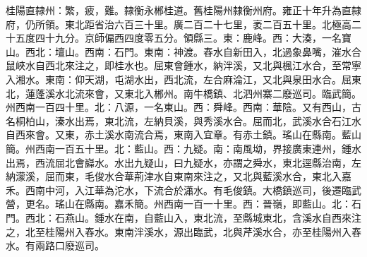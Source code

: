 \begin{pinyinscope}
桂陽直隸州：繁，疲，難。隸衡永郴桂道。舊桂陽州隸衡州府。雍正十年升為直隸府，仍所領。東北距省治六百三十里。廣二百二十七里，袤二百五十里。北極高二十五度四十九分。京師偏西四度零五分。領縣三。東：鹿峰。西：大湊，一名寶山。西北：壇山。西南：石門。東南：神渡。舂水自新田入，北過象鼻嘴，漼水合鼠峽水自西北來注之，即桂水也。屈東會鍾水，納泮溪，又北與楓江水合，至常寧入湘水。東南：仰天湖，屯湖水出，西北流，左合麻淪江，又北與泉田水合。屈東北，蓮蓬溪水北流來會，又東北入郴州。南牛橋鎮、北泗州寨二廢巡司。臨武簡。州西南一百四十里。北：八源，一名東山。西：舜峰。西南：華陰。又有西山，古名桐柏山，溱水出焉，東北流，左納貝溪，與秀溪水合。屈而北，武溪水合石江水自西來會。又東，赤土溪水南流合焉，東南入宜章。有赤土鎮。瑤山在縣南。藍山簡。州西南一百五十里。北：藍山。西：九疑。南：南風坳，界接廣東連州，鍾水出焉，西流屈北會巋水。水出九疑山，曰九疑水，亦謂之舜水，東北逕縣治南，左納濛溪，屈而東，毛俊水合華荊津水自東南來注之，又北與藍溪水合，東北入嘉禾。西南中河，入江華為沱水，下流合於瀟水。有毛俊鎮。大橋鎮巡司，後遷臨武營，更名。瑤山在縣南。嘉禾簡。州西南一百一十里。西：晉嶺，即藍山。北：石門。西北：石燕山。鍾水在南，自藍山入，東北流，至縣城東北，含溪水自西來注之，北至桂陽州入舂水。東南泮溪水，源出臨武，北與芹溪水合，亦至桂陽州入舂水。有兩路口廢巡司。


\end{pinyinscope}
